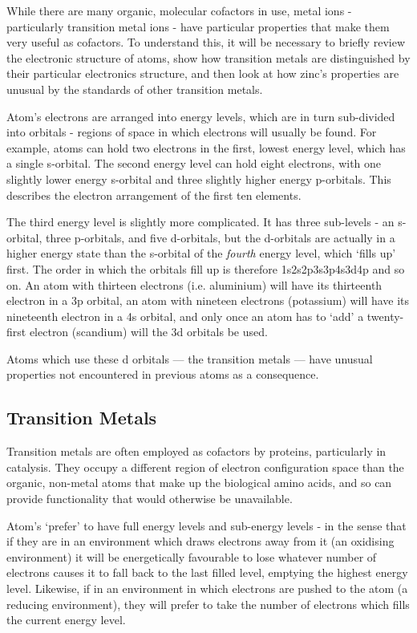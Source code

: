 While there are many organic, molecular cofactors in use, metal ions - particularly transition metal ions - have particular properties that make them very useful as cofactors. To understand this, it will be necessary to briefly review the electronic structure of atoms, show how transition metals are distinguished by their particular electronics structure, and then look at how zinc's properties are unusual by the standards of other transition metals.

Atom's electrons are arranged into energy levels, which are in turn sub-divided into orbitals - regions of space in which electrons will usually be found. For example, atoms can hold two electrons in the first, lowest energy level, which has a single s-orbital. The second energy level can hold eight electrons, with one slightly lower energy s-orbital and three slightly higher energy p-orbitals. This describes the electron arrangement of the first ten elements.

The third energy level is slightly more complicated. It has three sub-levels - an s-orbital, three p-orbitals, and five d-orbitals, but the d-orbitals are actually in a higher energy state than the s-orbital of the \emph{fourth} energy level, which `fills up' first. The order in which the orbitals fill up is therefore 1s2s2p3s3p4s3d4p and so on. An atom with thirteen electrons (i.e. aluminium) will have its thirteenth electron in a 3p orbital, an atom with nineteen electrons (potassium) will have its nineteenth electron in a 4s orbital, and only once an atom has to `add' a twenty-first electron (scandium) will the 3d orbitals be used.

Atoms which use these d orbitals --- the transition metals --- have unusual properties not encountered in previous atoms as a consequence.

\subsection{Transition Metals}

Transition metals are often employed as cofactors by proteins, particularly in catalysis. They occupy a different region of electron configuration space than the organic, non-metal atoms that make up the biological amino acids, and so can provide functionality that would otherwise be unavailable.

Atom's `prefer' to have full energy levels and sub-energy levels - in the sense that if they are in an environment which draws electrons away from it (an oxidising environment) it will be energetically favourable to lose whatever number of electrons causes it to fall back to the last filled level, emptying the highest energy level. Likewise, if in an environment in which electrons are pushed to the atom (a reducing environment), they will prefer to take the number of electrons which fills the current energy level.

